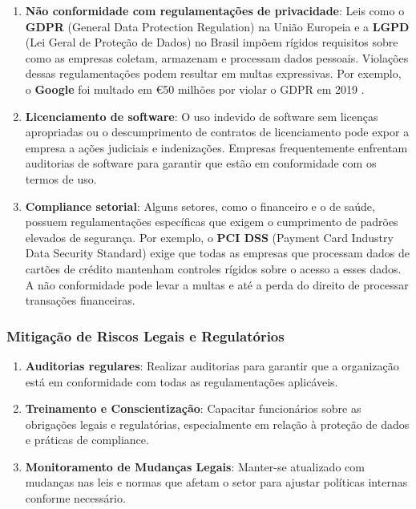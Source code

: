 \documentclass[12pt,oneside,a4paper,article]{abntex2}
\begin{document}
\begin{enumerate}
    \item \textbf{Não conformidade com regulamentações de privacidade}:
    Leis como o \textbf{GDPR} (General Data Protection Regulation) na União Europeia e a \textbf{LGPD} (Lei Geral de Proteção de Dados) no Brasil impõem rígidos requisitos sobre como as empresas coletam, armazenam e processam dados pessoais. Violações dessas regulamentações podem resultar em multas expressivas. Por exemplo, o \textbf{Google} foi multado em €50 milhões por violar o GDPR em 2019 \cite{googlefine}.
    
    \item \textbf{Licenciamento de software}:
    O uso indevido de software sem licenças apropriadas ou o descumprimento de contratos de licenciamento pode expor a empresa a ações judiciais e indenizações. Empresas frequentemente enfrentam auditorias de software para garantir que estão em conformidade com os termos de uso.
    
    \item \textbf{Compliance setorial}:
    Alguns setores, como o financeiro e o de saúde, possuem regulamentações específicas que exigem o cumprimento de padrões elevados de segurança. Por exemplo, o \textbf{PCI DSS} (Payment Card Industry Data Security Standard) exige que todas as empresas que processam dados de cartões de crédito mantenham controles rígidos sobre o acesso a esses dados. A não conformidade pode levar a multas e até a perda do direito de processar transações financeiras.
\end{enumerate}

\subsubsection{\textbf{Mitigação de Riscos Legais e Regulatórios}}

\begin{enumerate}
    \item \textbf{Auditorias regulares}: Realizar auditorias para garantir que a organização está em conformidade com todas as regulamentações aplicáveis.
    
    \item \textbf{Treinamento e Conscientização}: Capacitar funcionários sobre as obrigações legais e regulatórias, especialmente em relação à proteção de dados e práticas de compliance.
    
    \item \textbf{Monitoramento de Mudanças Legais}: Manter-se atualizado com mudanças nas leis e normas que afetam o setor para ajustar políticas internas conforme necessário.
\end{enumerate}
\end{document}

